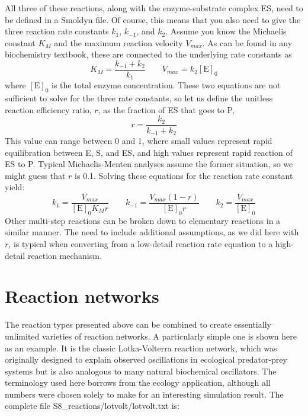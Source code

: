 \documentclass {scrbook}
\begin{document}
All three of these reactions, along with the enzyme-substrate complex ES, need to be defined in a Smoldyn file. Of course, this means that you also need to give the three reaction rate constants $k_1$, $k_{-1}$, and $k_2$. Assume you know the Michaelis constant $K_M$ and the maximum reaction velocity $V_{max}$. As can be found in any biochemistry textbook, these are connected to the underlying rate constants as
$$K_M = \frac{k_{-1} + k_2}{k_1} \qquad V_{max} = k_2 [\textrm{E}]_0$$
where $[\textrm{E}]_0$ is the total enzyme concentration. These two equations are not sufficient to solve for the three rate constants, so let us define the unitless reaction efficiency ratio, $r$, as the fraction of ES that goes to P,
$$r=\frac{k_2}{k_{-1}+k_2}$$
This value can range between 0 and 1, where small values represent rapid equilibration between E, S, and ES, and high values represent rapid reaction of ES to P. Typical Michaelis-Menten analyses assume the former situation, so we might guess that $r$ is 0.1. Solving these equations for the reaction rate constant yield:
$$k_1 = \frac{V_{max}}{[\textrm{E}]_0 K_M r} \qquad k_{-1} = \frac{V_{max} (1-r)}{[\textrm{E}]_0 r} \qquad k_2 = \frac{V_{max}}{[\textrm{E}]_0}$$
Other multi-step reactions can be broken down to elementary reactions in a similar manner. The need to include additional assumptions, as we did here with $r$, is typical when converting from a low-detail reaction rate equation to a high-detail reaction mechanism.

\section{Reaction networks}

The reaction types presented above can be combined to create essentially unlimited varieties of reaction networks. A particularly simple one is shown here as an example. It is the classic Lotka-Volterra reaction network, which was originally designed to explain observed oscillations in ecological predator-prey systems but is also analogous to many natural biochemical oscillators. The terminology used here borrows from the ecology application, although all numbers were chosen solely to make for an interesting simulation result. The complete file S8\_reactions/lotvolt/lotvolt.txt is:
\end{document}
